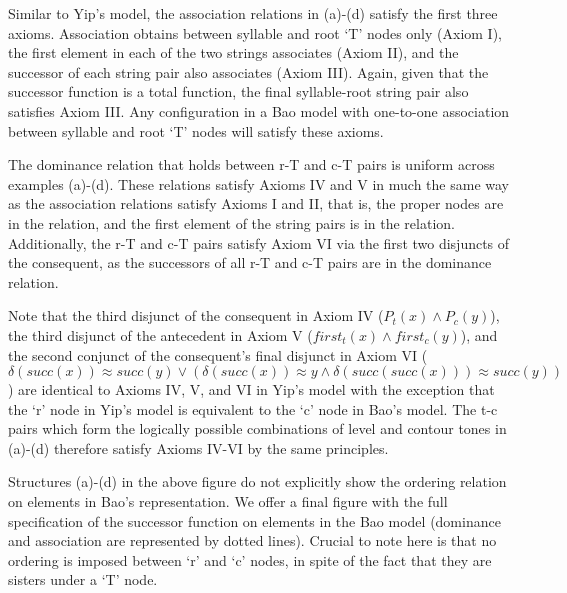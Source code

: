 \documentclass{article}
\newcommand{\ap}{\approx}
\begin{document}
Similar to Yip's model, the association relations in (a)-(d) satisfy the first three axioms. Association obtains between syllable and root `T' nodes only (Axiom I), the first element in each of the two strings associates (Axiom II), and the successor of each string pair also associates (Axiom III). Again, given that the successor function is a total function, the final syllable-root string pair also satisfies Axiom III. Any configuration in a Bao model with one-to-one association between syllable and root `T' nodes will satisfy these axioms. \par
The dominance relation that holds between r-T and c-T pairs is uniform across examples (a)-(d). These relations satisfy Axioms IV and V in much the same way as the association relations satisfy Axioms I and II, that is, the proper nodes are in the relation, and the first element of the string pairs is in the relation. Additionally, the r-T and c-T pairs satisfy Axiom VI via the first two disjuncts of the consequent, as the successors of all r-T and c-T pairs are in the dominance relation. \par
Note that the third disjunct of the consequent in Axiom IV ($P_{t}(x)\land P_{c}(y)$), the third disjunct of the antecedent in Axiom V ($first_{t}(x)\land first_{c}(y)$), and the second conjunct of the consequent's final disjunct in Axiom VI ($\delta(succ(x))\ap succ(y)\lor (\delta(succ(x))\ap y \land \delta(succ(succ(x)))\ap succ(y))$) are identical to Axioms IV, V, and VI in Yip's model with the exception that the `r' node in Yip's model is equivalent to the `c' node in Bao's model. The t-c pairs which form the logically possible combinations of level and contour tones in (a)-(d) therefore satisfy Axioms IV-VI by the same principles.\par
Structures (a)-(d) in the above figure do not explicitly show the ordering relation on elements in Bao's representation. We offer a final figure with the full specification of the successor function on elements in the Bao model (dominance and association are represented by dotted lines). Crucial to note here is that no ordering is imposed between `r' and `c' nodes, in spite of the fact that they are sisters under a `T' node.
\end{document}

